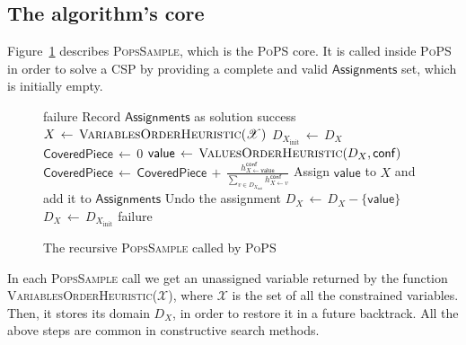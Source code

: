 \documentclass{ws-ijait}
\begin{document}
\subsection{The algorithm's core}

Figure~\ref{PopsSample} describes \textsc{PopsSample}, which is the \textsc{PoPS} core. It is called inside \textsc{PoPS} in order to solve a CSP by providing a complete and valid $\mathsf{Assignments}$ set, which is initially empty.

\begin{figure}
\centering
\begin{algorithmic}
                \State  \Return failure
                \State  Record $\mathsf{Assignments}$ as solution
                \State  \Return success
        \EndIf
        \State  $X \, \gets \, \Call{VariablesOrderHeuristic}{\mathscr{X}}$
        \State  $D_{X_\mathrm{init}} \, \gets \, D_X$
        \State  $\mathsf{CoveredPiece} \, \gets \, 0$
                \State  $\mathsf{value} \, \gets \, \Call{ValuesOrderHeuristic}{D_X, \mathsf{conf}}$
                \State  $\mathsf{CoveredPiece} \, \gets \, \mathsf{CoveredPiece} \, + \, \frac{h_{X \gets \mathsf{value}}^\mathsf{conf}}{\sum_{v \in D_{X_\mathrm{init}}} h_{X \gets v}^\mathsf{conf}}$
                \State  Assign $\mathsf{value}$ to $X$ and add it to $\mathsf{Assignments}$
                \State  {}
                \State  Undo the assignment
                \State  $D_X \, \gets \, D_X - \{\mathsf{value}\}$
        \EndWhile
        \State  $D_X \, \gets \, D_{X_\mathrm{init}}$
        \State  \Return failure
\EndFunction
\end{algorithmic}
\caption{The recursive {\normalfont\textsc{PopsSample}} called by {\normalfont\textsc{PoPS}}\label{PopsSample}}
\end{figure}

In each \textsc{PopsSample} call we get an unassigned variable returned by the function \textsc{VariablesOrderHeuristic}($\mathscr{X}$), where $\mathscr{X}$ is the set of all the constrained variables. Then, it stores its domain $D_X$, in order to restore it in a future backtrack. All the above steps are common in constructive search methods.
\end{document}
